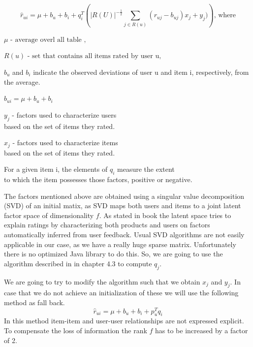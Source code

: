 \documentclass[pdftex,a4paper,11pt]{article}
\begin{document}
\begin{equation} \label{1} \hat{r}_{u i} = \mu + b_u + b_i + q^T _i \left( | R(U) |^{ - \frac{1}{2}} \sum_{j \in R(u) } (r_{u j} - b_{u j}) x_j + y_j ) \right) \text{, where} \end{equation}
\begin{center} $  \mu \text{ - average overl all table  ,}  $ \end{center}
\begin{center} $   R(u) \text{ - set that contains all items rated by user u,} $ \end{center}
\begin{center} $ b_u $ and $ b_i $ indicate the observed deviations of user u and item i, respectively, from the average.
 \end{center}
\begin{center} $  b_{u i} = \mu + b_u + b_i $ \end{center}
\begin{center} $  y_j $  - factors used to characterize users \\ based on the set of items they rated.   \end{center}
\begin{center} $  x_j $ - factors used to characterize items \\ based on the set of items they rated.  \end{center}
\begin{center} For a given item i, the elements of $ q_i $ measure the extent \\ to which the item possesses those factors, positive or negative. \end{center}

The factors mentioned above are obtained using a singular value decomposition (SVD) of an initial matix, as SVD maps both users and items to a joint latent factor space of dimensionality $ f $. As stated in book \cite{1} the latent space tries to explain ratings by characterizing both products and users on factors automatically inferred from user feedback. Usual SVD algorithms are not easily applicable in our case, as we have a really huge sparse matrix. Unfortunately there is no optimized Java library to do this. So, we are going to use the algorithm described in \cite{2} in chapter 4.3 to compute $q_j$.

We are going to try to modify the algorithm such that we obtain $x_j$ and $y_j$. In case that we do not achieve an initialization of these we will use the following method as fall back.
\begin{equation} \label{1.2} \hat{r}_{u i} = \mu + b_u + b_i + p^T _u q_i \end{equation}
In this method item-item and user-user relationships are not expressed explicit. To compensate the loss of information the rank $f$ has to be increased by a factor of 2.
\end{document}

